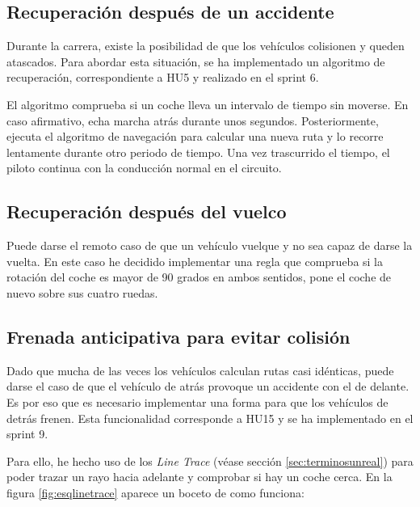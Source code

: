 \subsection{Recuperación después de un accidente}

Durante la carrera, existe la posibilidad de que los vehículos colisionen y queden atascados. Para abordar esta situación, se ha implementado un algoritmo de recuperación, correspondiente a HU5 y realizado en el sprint 6. 

\bigskip

El algoritmo comprueba si un coche lleva un intervalo de tiempo sin moverse. En caso afirmativo, echa marcha atrás durante unos segundos. Posteriormente, ejecuta el algoritmo de navegación para calcular una nueva ruta y lo recorre lentamente durante otro periodo de tiempo. Una vez trascurrido el tiempo, el piloto continua con la conducción normal en el circuito.


\subsection{Recuperación después del vuelco}

Puede darse el remoto caso de que un vehículo vuelque y no sea capaz de darse la vuelta. En este caso he decidido implementar una regla que comprueba si la rotación del coche es mayor de 90 grados en ambos sentidos, pone el coche de nuevo sobre sus cuatro ruedas.


\subsection{Frenada anticipativa para evitar colisión}
\label{sec:frenada}

Dado que mucha de las veces los vehículos calculan rutas casi idénticas, puede darse el caso de que el vehículo de atrás provoque un accidente con el de delante. Es por eso que es necesario implementar una forma para que los vehículos de detrás frenen. Esta funcionalidad corresponde a HU15 y se ha implementado en el sprint 9.

\bigskip

Para ello, he hecho uso de los \textit{Line Trace} (véase sección \ref{sec:terminosunreal}) para poder trazar un rayo hacia adelante y comprobar si hay un coche cerca. En la figura \ref{fig:esqlinetrace} aparece un boceto de como funciona:

